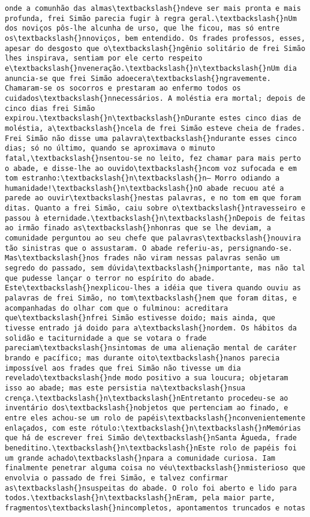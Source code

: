 \documentclass[11pt]{article}
\begin{document}
\begin{Verbatim}[commandchars=\\\{\}]
onde a comunhão das almas\textbackslash{}ndeve ser mais pronta e mais profunda, frei Simão parecia fugir à regra geral.\textbackslash{}nUm dos noviços pôs-lhe alcunha de urso, que lhe ficou, mas só entre os\textbackslash{}nnoviços, bem entendido. Os frades professos, esses, apesar do desgosto que o\textbackslash{}ngênio solitário de frei Simão lhes inspirava, sentiam por ele certo respeito e\textbackslash{}nveneração.\textbackslash{}n\textbackslash{}nUm dia anuncia-se que frei Simão adoecera\textbackslash{}ngravemente. Chamaram-se os socorros e prestaram ao enfermo todos os cuidados\textbackslash{}nnecessários. A moléstia era mortal; depois de cinco dias frei Simão expirou.\textbackslash{}n\textbackslash{}nDurante estes cinco dias de moléstia, a\textbackslash{}ncela de frei Simão esteve cheia de frades. Frei Simão não disse uma palavra\textbackslash{}ndurante esses cinco dias; só no último, quando se aproximava o minuto fatal,\textbackslash{}nsentou-se no leito, fez chamar para mais perto o abade, e disse-lhe ao ouvido\textbackslash{}ncom voz sufocada e em tom estranho:\textbackslash{}n\textbackslash{}n— Morro odiando a humanidade!\textbackslash{}n\textbackslash{}nO abade recuou até a parede ao ouvir\textbackslash{}nestas palavras, e no tom em que foram ditas. Quanto a frei Simão, caiu sobre o\textbackslash{}ntravesseiro e passou à eternidade.\textbackslash{}n\textbackslash{}nDepois de feitas ao irmão finado as\textbackslash{}nhonras que se lhe deviam, a comunidade perguntou ao seu chefe que palavras\textbackslash{}nouvira tão sinistras que o assustaram. O abade referiu-as, persignando-se. Mas\textbackslash{}nos frades não viram nessas palavras senão um segredo do passado, sem dúvida\textbackslash{}nimportante, mas não tal que pudesse lançar o terror no espírito do abade. Este\textbackslash{}nexplicou-lhes a idéia que tivera quando ouviu as palavras de frei Simão, no tom\textbackslash{}nem que foram ditas, e acompanhadas do olhar com que o fulminou: acreditara que\textbackslash{}nfrei Simão estivesse doido; mais ainda, que tivesse entrado já doido para a\textbackslash{}nordem. Os hábitos da solidão e taciturnidade a que se votara o frade pareciam\textbackslash{}nsintomas de uma alienação mental de caráter brando e pacífico; mas durante oito\textbackslash{}nanos parecia impossível aos frades que frei Simão não tivesse um dia revelado\textbackslash{}nde modo positivo a sua loucura; objetaram isso ao abade; mas este persistia na\textbackslash{}nsua crença.\textbackslash{}n\textbackslash{}nEntretanto procedeu-se ao inventário dos\textbackslash{}nobjetos que pertenciam ao finado, e entre eles achou-se um rolo de papéis\textbackslash{}nconvenientemente enlaçados, com este rótulo:\textbackslash{}n\textbackslash{}nMemórias que há de escrever frei Simão de\textbackslash{}nSanta Águeda, frade beneditino.\textbackslash{}n\textbackslash{}nEste rolo de papéis foi um grande achado\textbackslash{}npara a comunidade curiosa. Iam finalmente penetrar alguma coisa no véu\textbackslash{}nmisterioso que envolvia o passado de frei Simão, e talvez confirmar as\textbackslash{}nsuspeitas do abade. O rolo foi aberto e lido para todos.\textbackslash{}n\textbackslash{}nEram, pela maior parte, fragmentos\textbackslash{}nincompletos, apontamentos truncados e notas 
\end{Verbatim}
\end{document}
